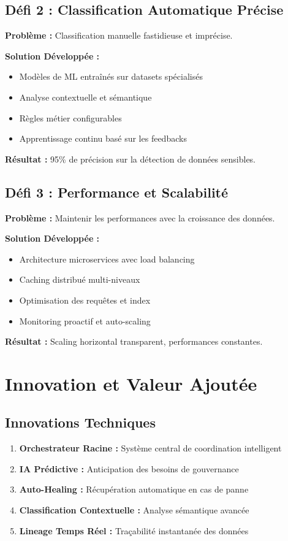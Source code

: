 \documentclass[a4paper,12pt]{article}
\begin{document}
\subsection*{Défi 2 : Classification Automatique Précise}

\textbf{Problème :} Classification manuelle fastidieuse et imprécise.

\textbf{Solution Développée :}
\begin{itemize}
    \item Modèles de ML entraînés sur datasets spécialisés
    \item Analyse contextuelle et sémantique
    \item Règles métier configurables
    \item Apprentissage continu basé sur les feedbacks
\end{itemize}

\textbf{Résultat :} 95\% de précision sur la détection de données sensibles.

\subsection*{Défi 3 : Performance et Scalabilité}

\textbf{Problème :} Maintenir les performances avec la croissance des données.

\textbf{Solution Développée :}
\begin{itemize}
    \item Architecture microservices avec load balancing
    \item Caching distribué multi-niveaux
    \item Optimisation des requêtes et index
    \item Monitoring proactif et auto-scaling
\end{itemize}

\textbf{Résultat :} Scaling horizontal transparent, performances constantes.

\section*{Innovation et Valeur Ajoutée}

\subsection*{Innovations Techniques}

\begin{enumerate}
    \item \textbf{Orchestrateur Racine :} Système central de coordination intelligent
    \item \textbf{IA Prédictive :} Anticipation des besoins de gouvernance
    \item \textbf{Auto-Healing :} Récupération automatique en cas de panne
    \item \textbf{Classification Contextuelle :} Analyse sémantique avancée
    \item \textbf{Lineage Temps Réel :} Traçabilité instantanée des données
\end{enumerate}
\end{document}
